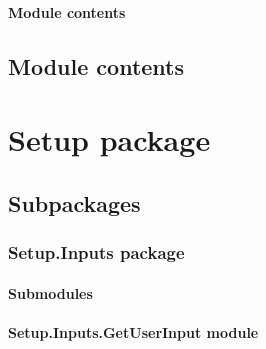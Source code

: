 \documentclass[letterpaper,10pt,english]{sphinxmanual}
\begin{document}
\paragraph{Module contents}
\label{\detokenize{PodApi.Stream:module-PodApi.Stream}}\label{\detokenize{PodApi.Stream:module-contents}}

\subsection{Module contents}
\label{\detokenize{PodApi:module-PodApi}}\label{\detokenize{PodApi:module-contents}}
\sphinxstepscope


\section{Setup package}
\label{\detokenize{Setup:setup-package}}\label{\detokenize{Setup::doc}}

\subsection{Subpackages}
\label{\detokenize{Setup:subpackages}}
\sphinxstepscope


\subsubsection{Setup.Inputs package}
\label{\detokenize{Setup.Inputs:setup-inputs-package}}\label{\detokenize{Setup.Inputs::doc}}

\paragraph{Submodules}
\label{\detokenize{Setup.Inputs:submodules}}

\paragraph{Setup.Inputs.GetUserInput module}
\label{\detokenize{Setup.Inputs:module-Setup.Inputs.GetUserInput}}\label{\detokenize{Setup.Inputs:setup-inputs-getuserinput-module}}
\end{document}
